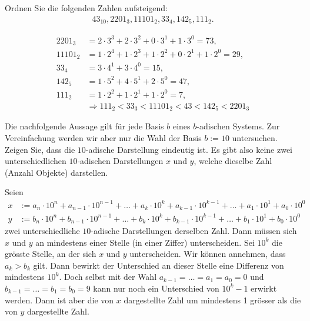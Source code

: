 \begin{myexercise}
	Ordnen Sie die folgenden Zahlen aufsteigend:
	\begin{align*}
		43_{10}, 2201_3, 11101_2, 33_4, 142_5, 111_2.
	\end{align*}
	\begin{myanswer}
		\begin{align*}
			2201_3  & = 2\cdot 3^3 + 2\cdot 3^2 + 0\cdot 3^1 + 1\cdot 3^0 = 73,              \\
			11101_2 & = 1\cdot 2^4 + 1\cdot 2^3 + 1\cdot 2^2 + 0\cdot 2^1 + 1\cdot 2^0 = 29, \\
			33_4    & = 3\cdot 4^1 + 3\cdot 4^0 = 15,                                        \\
			142_5   & = 1\cdot 5^2 + 4\cdot 5^1 + 2\cdot 5^0 = 47,                           \\
			111_2   & = 1\cdot 2^2 + 1\cdot 2^1 + 1\cdot 2^0 = 7,                            \\
			        & \Rightarrow 111_2 < 33_3 < 11101_2 < 43 < 142_5 < 2201_3
		\end{align*}
	\end{myanswer}
\end{myexercise}

\begin{mychallenge}
	Die nachfolgende Aussage gilt für jede Basis $b$ eines $b$-adischen Systems. Zur Vereinfachung werden wir aber nur die Wahl der Basis $b := 10$ untersuchen.
	Zeigen Sie, dass die $10$-adische Darstellung eindeutig ist. Es gibt also keine zwei unterschiedlichen $10$-adischen Darstellungen $x$ und $y$, welche dieselbe Zahl (Anzahl Objekte) darstellen.
	\begin{myanswer}
		Seien
		\begin{align*}
			x & := a_n\cdot 10^n + a_{n-1}\cdot 10^{n-1} + \ldots + a_k\cdot 10^k + a_{k-1}\cdot 10^{k-1} + \ldots + a_1\cdot 10^1 + a_0\cdot 10^0 \\
			y & := b_n\cdot 10^n + b_{n-1}\cdot 10^{n-1} + \ldots + b_k\cdot 10^k + b_{k-1}\cdot 10^{k-1} + \ldots + b_1\cdot 10^1 + b_0\cdot 10^0
		\end{align*}
		zwei unterschiedliche $10$-adische Darstellungen derselben Zahl.
		Dann müssen sich $x$ und $y$ an mindestens einer Stelle (in einer Ziffer) unterscheiden.
		Sei $10^k$ die grösste Stelle, an der sich $x$ und $y$ unterscheiden. Wir können annehmen, dass $a_k > b_k$ gilt. Dann bewirkt der Unterschied an dieser Stelle
		eine Differenz von mindestens $10^k$. Doch selbst mit der Wahl $a_{k-1} = \ldots = a_1 = a_0 = 0$ und $b_{k-1} = \ldots = b_1 = b_0 = 9$ kann nur noch ein Unterschied von $10^k - 1$ erwirkt werden.
		Dann ist aber die von $x$ dargestellte Zahl um mindestens 1 grösser als die von $y$ dargestellte Zahl.
	\end{myanswer}
\end{mychallenge}

